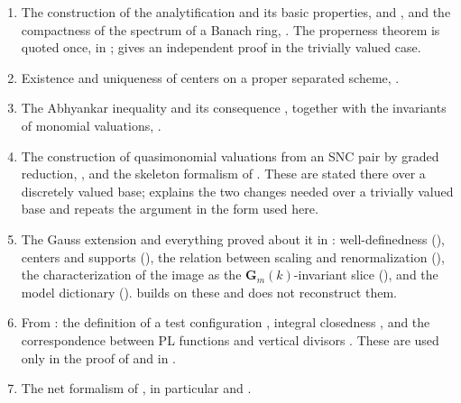 \begin{enumerate}
\item\label{itm:ch32-import:berk}
The construction of the analytification and its basic properties,
 and , and
the compactness of the spectrum of a Banach ring,
.  The properness theorem
 is quoted once, in
;  gives
an independent proof in the trivially valued case.

\item\label{itm:ch32-import:centers}
Existence and uniqueness of centers on a proper separated scheme,
.

\item\label{itm:ch32-import:abhyankar}
The Abhyankar inequality  and its consequence
, together with the invariants of monomial
valuations, .

\item\label{itm:ch32-import:skeleta}
The construction of quasimonomial valuations from an SNC pair by graded
reduction, , and the skeleton formalism of
.  These are stated there over a discretely valued base;
 explains the two changes needed over a
trivially valued base and repeats the argument in the form used here.

\item\label{itm:ch32-import:gauss}
The Gauss extension and everything proved about it in
: well-definedness
(), centers and supports
(), the relation between scaling and
renormalization (), the characterization of the
image as the $\mathbf G_m(k)$-invariant slice
(), and the model dictionary
().   builds on
these and does not reconstruct them.

\item\label{itm:ch32-import:tc}
From : the definition of a test
configuration , integral closedness
, and the correspondence between PL functions
and vertical divisors .  These are used only
in the proof of  and in
.

\item\label{itm:ch32-import:nets}
The net formalism of , in particular
 and .
\end{enumerate}

